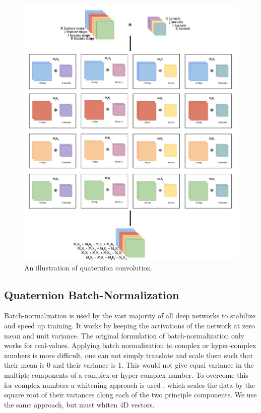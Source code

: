 \begin{figure}
	\centering
		\includegraphics[width=1.0\textwidth]{figures/quatconv.png}
	\caption{An illustration of quaternion convolution.}
	\label{f:quatconv}
\end{figure}


\subsection{Quaternion Batch-Normalization}
Batch-normalization \cite{ioffe2015batch} is used by the vast majority of all deep networks to stabilize and speed up training.
It works by keeping the activations of the network at zero mean and unit variance.
The original formulation of batch-normalization only works for real-values. 
Applying batch normalization to complex or hyper-complex numbers is more difficult, one can not simply translate and scale them such that their mean is 0 and their variance is 1.
This would not give equal variance in the multiple components of a complex or hyper-complex number.
To overcome this for complex numbers a whitening approach is used \cite{trabelsi2017deep}, which scales the data by the square root of their variances along each of the two principle components.
We use the same approach, but must whiten 4D vectors.

